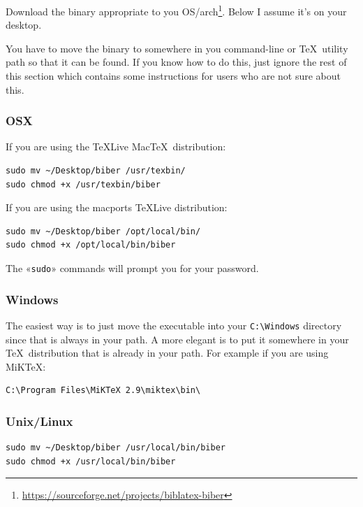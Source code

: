 \documentclass{ltxdockit}
\begin{document}
Download the binary appropriate to you
OS/arch\footnote{\url{https://sourceforge.net/projects/biblatex-biber}}. Below
I assume it's on your desktop.

You have to move the binary to somewhere in you command-line or \TeX\ utility
path so that it can be found. If you know how to do this, just ignore the
rest of this section which contains some instructions for users who are
not sure about this.

\subsubsection{OSX}

If you are using the \TeX Live Mac\TeX\ distribution:

\begin{verbatim}
sudo mv ~/Desktop/biber /usr/texbin/
sudo chmod +x /usr/texbin/biber
\end{verbatim}

\noindent If you are using the macports \TeX Live distribution:

\begin{verbatim}
sudo mv ~/Desktop/biber /opt/local/bin/
sudo chmod +x /opt/local/bin/biber
\end{verbatim}

\noindent The «\verb+sudo+» commands will prompt you for your password.

\subsubsection{Windows}

The easiest way is to just move the executable into your \verb+C:\Windows+ directory since
that is always in your path. A more elegant is to put it somewhere in
your \TeX\ distribution that is already in your path. For example if you
are using MiK\TeX:

\begin{verbatim}
C:\Program Files\MiKTeX 2.9\miktex\bin\
\end{verbatim}

\subsubsection{Unix/Linux}

\begin{verbatim}
sudo mv ~/Desktop/biber /usr/local/bin/biber
sudo chmod +x /usr/local/bin/biber
\end{verbatim}
\end{document}

